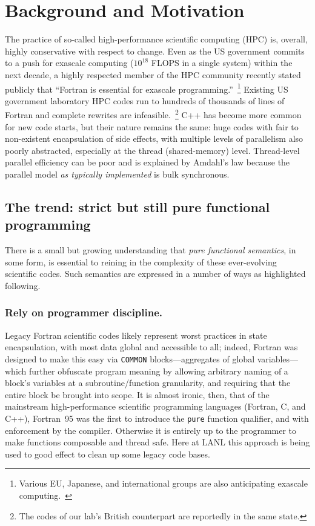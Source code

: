 \documentclass{llncs}
\begin{document}
\section{Background and Motivation}
The practice of so-called high-performance scientific computing (HPC) is,
overall, highly conservative with respect to change.  Even as the US
government commits to a push for exascale computing ($10^{18}$ FLOPS in a
single system) within the next decade, a highly respected member of the HPC
community recently stated publicly that ``Fortran is essential for exascale
programming.''~\cite{Heroux16}\footnote{Various EU, Japanese, and
  international groups are also anticipating exascale
  computing.~\cite{EUexascale,Exascale-org}} Existing US government laboratory
HPC codes run to hundreds of thousands of lines of Fortran and complete
rewrites are infeasible.~\footnote{The codes of our lab's British counterpart
  are reportedly in the same state.}  C++ has become more common for new code
starts, but their nature remains the same: huge codes with fair to
non-existent encapsulation of side effects, with multiple levels of
parallelism also poorly abstracted, especially at the thread (shared-memory)
level.  Thread-level parallel efficiency can be poor and is explained by
Amdahl's law because the parallel model \emph{as typically implemented} is
bulk synchronous.



\subsection{The trend: strict but still pure functional programming}
There is a small but growing understanding that \emph{pure functional
  semantics}, in some form, is essential to reining in the complexity of these
ever-evolving scientific codes.  Such semantics are expressed in a number
of ways as highlighted following.

\subsubsection{Rely on programmer discipline.}
Legacy Fortran scientific codes likely represent worst practices in state
encapsulation, with most data global and accessible to all; indeed, Fortran
was designed to make this easy via \texttt{COMMON} blocks---aggregates of
global variables---which further obfuscate program meaning by allowing
arbitrary naming of a block's variables at a subroutine/function granularity,
and requiring that the entire block be brought into scope.  It is almost
ironic, then, that of the mainstream high-performance scientific programming
languages (Fortran, C, and C++), Fortran~95 was the first to introduce the
\texttt{pure} function qualifier, and with enforcement by the compiler.
Otherwise it is entirely up to the programmer to make functions composable and
thread safe.  Here at LANL this approach is being used to good effect to clean
up some legacy code bases.
\end{document}
